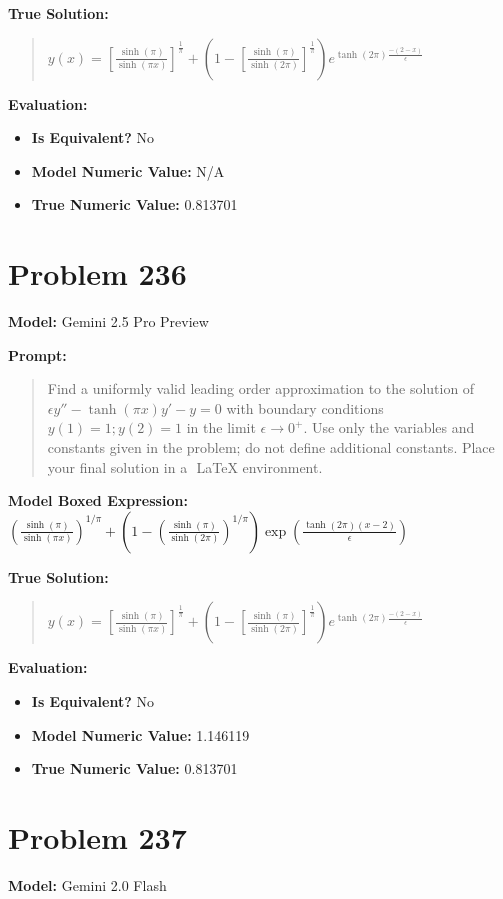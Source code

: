 \documentclass{article}
\begin{document}
{\textbf{True Solution:}
\begin{quote}
$y(x) = [\frac{\sinh(\pi)}{\sinh(\pi x)}]^\frac{1}{\pi} + (1-[\frac{\sinh(\pi)}{\sinh(2\pi)}]^\frac{1}{\pi})e^{\tanh(2\pi)\frac{-(2-x)}{\epsilon}}$
\end{quote}

\textbf{Evaluation:}
\begin{itemize}
\item \textbf{Is Equivalent?} No
\item \textbf{Model Numeric Value:} N/A
\item \textbf{True Numeric Value:} 0.813701
\end{itemize}
\vspace{1cm}
\section*{Problem 236}
\textbf{Model:} Gemini 2.5 Pro Preview

\textbf{Prompt:}
\begin{quote}
Find a uniformly valid leading order approximation to the solution of $\epsilon y'' - \tanh(\pi x)y' - y = 0$ with boundary conditions $y(1) = 1; y(2) = 1$ in the limit $\epsilon \to 0^+$. Use only the variables and constants given in the problem; do not define additional constants. Place your final solution in a $\boxed{}$ LaTeX environment.
\end{quote}
\textbf{Model Boxed Expression:} $\left(\frac{\sinh(\pi)}{\sinh(\pi x)}\right)^{1/\pi} + \left(1 - \left(\frac{\sinh(\pi)}{\sinh(2\pi)}\right)^{1/\pi}\right) \exp\left(\frac{\tanh(2\pi)(x-2)}{\epsilon}\right)$

\textbf{True Solution:}
\begin{quote}
$y(x) = [\frac{\sinh(\pi)}{\sinh(\pi x)}]^\frac{1}{\pi} + (1-[\frac{\sinh(\pi)}{\sinh(2\pi)}]^\frac{1}{\pi})e^{\tanh(2\pi)\frac{-(2-x)}{\epsilon}}$
\end{quote}

\textbf{Evaluation:}
\begin{itemize}
\item \textbf{Is Equivalent?} No
\item \textbf{Model Numeric Value:} 1.146119
\item \textbf{True Numeric Value:} 0.813701
\end{itemize}
\vspace{1cm}
\section*{Problem 237}
\textbf{Model:} Gemini 2.0 Flash

}
\end{document}

